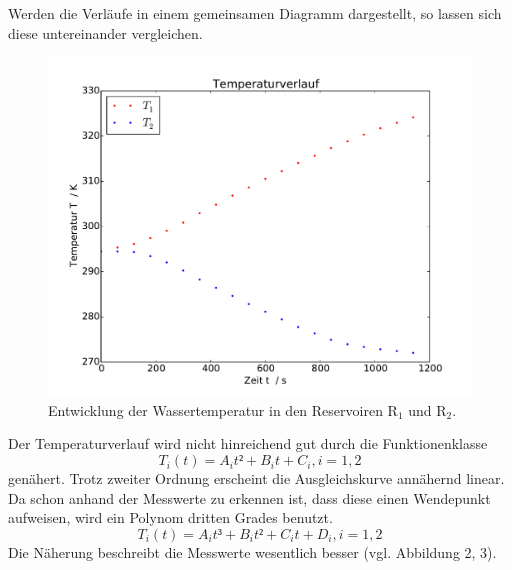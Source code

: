 \newpage
\noindent Werden die Verläufe in einem gemeinsamen Diagramm dargestellt, so lassen sich diese untereinander vergleichen. 
\begin{figure}
	\includegraphics[width=\textwidth]{Bilder/Temperaturverlauf.pdf}
	\caption{Entwicklung der Wassertemperatur in den Reservoiren $\mathup{R_1}$ und $\mathup{R_2}$.}
	\label{fig:temperaturverlauf}
\end{figure}
Der Temperaturverlauf wird nicht hinreichend gut durch die Funktionenklasse
\begin{equation}
	T_i(t)=A_i t² + B_i t + C_i , i=1,2
	\label{eq:t-verlauf_Grad2}
\end{equation}
genähert. 
Trotz zweiter Ordnung erscheint die Ausgleichskurve annähernd linear. 
Da schon anhand der Messwerte zu erkennen ist, dass diese einen Wendepunkt aufweisen, wird ein Polynom dritten Grades benutzt. 
\begin{equation}
	T_i(t)=A_i t³ + B_i t² + C_i t + D_i , i=1,2
	\label{eq:t-verlauf_Grad3}
\end{equation}
Die Näherung beschreibt die Messwerte wesentlich besser (vgl. Abbildung 2, 3). 



